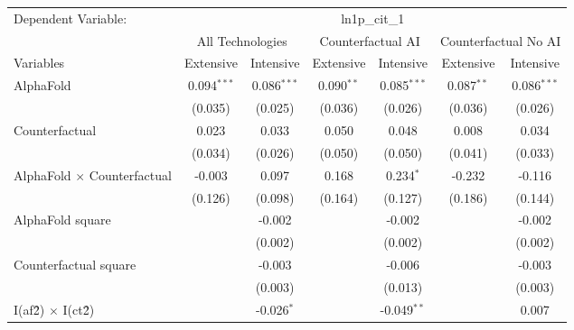 \begingroup
\centering
\begin{tabular}{lcccccc}
   \tabularnewline \midrule \midrule
   Dependent Variable: & \multicolumn{6}{c}{ln1p\_cit\_1}\\
 & \multicolumn{2}{c}{All Technologies} & \multicolumn{2}{c}{Counterfactual AI} & \multicolumn{2}{c}{Counterfactual No AI} \\
\cmidrule(lr){1-1}\cmidrule(lr){2-3} \cmidrule(lr){4-5} \cmidrule(lr){6-7}
Variables & \multicolumn{1}{c}{Extensive} & \multicolumn{1}{c}{Intensive} & \multicolumn{1}{c}{Extensive} & \multicolumn{1}{c}{Intensive} & \multicolumn{1}{c}{Extensive} & \multicolumn{1}{c}{Intensive} \\
\cmidrule(lr){1-1}\cmidrule(lr){2-2} \cmidrule(lr){3-3} \cmidrule(lr){4-4} \cmidrule(lr){5-5} \cmidrule(lr){6-6} \cmidrule(lr){7-7}
   AlphaFold                          & 0.094$^{***}$ & 0.086$^{***}$ & 0.090$^{**}$ & 0.085$^{***}$ & 0.087$^{**}$ & 0.086$^{***}$\\   
                                      & (0.035)       & (0.025)       & (0.036)      & (0.026)       & (0.036)      & (0.026)\\   
   Counterfactual                     & 0.023         & 0.033         & 0.050        & 0.048         & 0.008        & 0.034\\   
                                      & (0.034)       & (0.026)       & (0.050)      & (0.050)       & (0.041)      & (0.033)\\   
   AlphaFold $\times$ Counterfactual  & -0.003        & 0.097         & 0.168        & 0.234$^{*}$   & -0.232       & -0.116\\   
                                      & (0.126)       & (0.098)       & (0.164)      & (0.127)       & (0.186)      & (0.144)\\   
   AlphaFold square                   &               & -0.002        &              & -0.002        &              & -0.002\\   
                                      &               & (0.002)       &              & (0.002)       &              & (0.002)\\   
   Counterfactual square              &               & -0.003        &              & -0.006        &              & -0.003\\   
                                      &               & (0.003)       &              & (0.013)       &              & (0.003)\\   
   I(af\^2) $\times$ I(ct\^2)         &               & -0.026$^{*}$  &              & -0.049$^{**}$ &              & 0.007\\   

\end{tabular}
